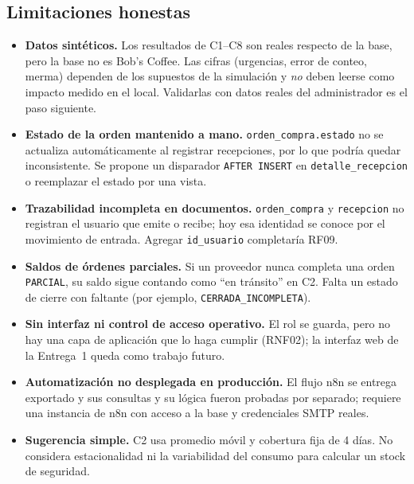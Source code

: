 \documentclass[11pt,letterpaper]{article}
\begin{document}
\subsection{Limitaciones honestas}
\begin{itemize}[leftmargin=*,itemsep=2pt]
  \item \textbf{Datos sintéticos.} Los resultados de C1--C8 son reales respecto de la base, pero la base no es Bob's Coffee. Las cifras (urgencias, error de conteo, merma) dependen de los supuestos de la simulación y \emph{no} deben leerse como impacto medido en el local. Validarlas con datos reales del administrador es el paso siguiente.
  \item \textbf{Estado de la orden mantenido a mano.} \texttt{orden\_compra.estado} no se actualiza automáticamente al registrar recepciones, por lo que podría quedar inconsistente. Se propone un disparador \texttt{AFTER INSERT} en \texttt{detalle\_recepcion} o reemplazar el estado por una vista.
  \item \textbf{Trazabilidad incompleta en documentos.} \texttt{orden\_compra} y \texttt{recepcion} no registran el usuario que emite o recibe; hoy esa identidad se conoce por el movimiento de entrada. Agregar \texttt{id\_usuario} completaría RF09.
  \item \textbf{Saldos de órdenes parciales.} Si un proveedor nunca completa una orden \texttt{PARCIAL}, su saldo sigue contando como ``en tránsito'' en C2. Falta un estado de cierre con faltante (por ejemplo, \texttt{CERRADA\_INCOMPLETA}).
  \item \textbf{Sin interfaz ni control de acceso operativo.} El rol se guarda, pero no hay una capa de aplicación que lo haga cumplir (RNF02); la interfaz web de la Entrega~1 queda como trabajo futuro.
  \item \textbf{Automatización no desplegada en producción.} El flujo n8n se entrega exportado y sus consultas y su lógica fueron probadas por separado; requiere una instancia de n8n con acceso a la base y credenciales SMTP reales.
  \item \textbf{Sugerencia simple.} C2 usa promedio móvil y cobertura fija de 4 días. No considera estacionalidad ni la variabilidad del consumo para calcular un stock de seguridad.
\end{itemize}
\end{document}
